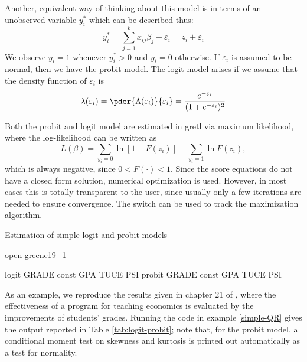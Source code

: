 Another, equivalent way of thinking about this model is in terms of
an unobserved variable $y^*_i$ which can be described thus:
%
\begin{equation}
  \label{eq:qr-latent}
  y^*_i = \sum_{j=1}^k x_{ij} \beta_j + \varepsilon_i = z_i  +
  \varepsilon_i 
\end{equation}
%
We observe $y_i = 1$ whenever $y^*_i > 0$ and $y_i = 0$ otherwise. If
$\varepsilon_i$ is assumed to be normal, then we have the probit
model. The logit model arises if we assume that the density function
of $\varepsilon_i$ is
%
\[
  \lambda(\varepsilon_i) =
  \pder{\Lambda(\varepsilon_i)}{\varepsilon_i} =
  \frac{e^{-\varepsilon_i}}{(1 + e^{-\varepsilon_i})^2}
\]

Both the probit and logit model are estimated in gretl via
maximum likelihood, where the log-likelihood can be written as
\begin{equation}
  \label{eq:qr-loglik}
  L(\beta) = \sum_{y_i=0} \ln [ 1 - F(z_i)] + \sum_{y_i=1} \ln F(z_i),
\end{equation}
which is always negative, since $0 < F(\cdot) < 1$.  Since the score
equations do not have a closed form solution, numerical optimization
is used. However, in most cases this is totally transparent to the
user, since usually only a few iterations are needed to ensure
convergence. The  switch can be used to track the
maximization algorithm.

\begin{script}[htbp]
  \caption{Estimation of simple logit and probit models}
  \label{simple-QR}
\begin{scode}
open greene19_1

logit GRADE const GPA TUCE PSI
probit GRADE const GPA TUCE PSI
\end{scode}
\end{script}

As an example, we reproduce the results given in chapter 21 of
\cite{greene00}, where the effectiveness of a program for teaching
economics is evaluated by the improvements of students' grades.
Running the code in example \ref{simple-QR} gives the output reported
in Table \ref{tab:logit-probit}; note that, for the probit model, a 
conditional moment test on skewness and kurtosis is printed out
automatically as a test for normality.

